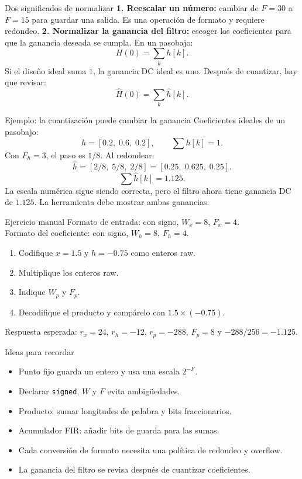 \documentclass[aspectratio=169,10pt]{beamer}
\begin{document}
\begin{frame}{Dos significados de normalizar}
  \textbf{1. Reescalar un número:} cambiar de $F=30$ a $F=15$ para guardar una
  salida. Es una operación de formato y requiere redondeo.
  \vfill
  \textbf{2. Normalizar la ganancia del filtro:} escoger los coeficientes para
  que la ganancia deseada se cumpla. En un pasobajo:
  \[
    H(0)=\sum_k h[k].
  \]
  Si el diseño ideal suma $1$, la ganancia DC ideal es uno. Después de
  cuantizar, hay que revisar:
  \[
    \widehat{H}(0)=\sum_k \widehat{h}[k].
  \]
\end{frame}

\begin{frame}{Ejemplo: la cuantización puede cambiar la ganancia}
  Coeficientes ideales de un pasobajo:
  \[
    h=[0.2,\;0.6,\;0.2],\qquad \sum h[k]=1.
  \]
  Con $F_h=3$, el paso es $1/8$. Al redondear:
  \[
    \widehat{h}=[2/8,\;5/8,\;2/8]=[0.25,\;0.625,\;0.25].
  \]
  \[
    \sum\widehat{h}[k]=1.125.
  \]
  La escala numérica sigue siendo correcta, pero el filtro ahora tiene ganancia
  DC de $1.125$. La herramienta debe mostrar ambas ganancias.
\end{frame}

\begin{frame}{Ejercicio manual}
  Formato de entrada: con signo, $W_x=8$, $F_x=4$.\\[4pt]
  Formato del coeficiente: con signo, $W_h=8$, $F_h=4$.\\[8pt]
  \begin{enumerate}
    \item Codifique $x=1.5$ y $h=-0.75$ como enteros raw.
    \item Multiplique los enteros raw.
    \item Indique $W_p$ y $F_p$.
    \item Decodifique el producto y compárelo con $1.5\times(-0.75)$.
  \end{enumerate}
  \vfill
  Respuesta esperada: $r_x=24$, $r_h=-12$, $r_p=-288$, $F_p=8$ y
  $-288/256=-1.125$.
\end{frame}

\begin{frame}{Ideas para recordar}
  \begin{itemize}
    \item Punto fijo guarda un entero y usa una escala $2^{-F}$.
    \item Declarar \texttt{signed}, $W$ y $F$ evita ambigüedades.
    \item Producto: sumar longitudes de palabra y bits fraccionarios.
    \item Acumulador FIR: añadir bits de guarda para las sumas.
    \item Cada conversión de formato necesita una política de redondeo y
    overflow.
    \item La ganancia del filtro se revisa después de cuantizar coeficientes.
  \end{itemize}
\end{frame}
\end{document}
